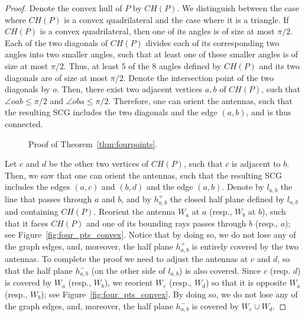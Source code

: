 \documentclass[11pt,letter]{article}
\newcommand{\old}[1]{{{}}}
\def\wedge#1{{W_{{#1}}}}
\begin{document}
\begin{proof}
Denote the convex hull of $P$ by $CH(P)$.
We distinguish between the case where $CH(P)$ is a convex quadrilateral and the case where it is a triangle.
If $CH(P)$ is a convex quadrilateral, then one of its angles is of size at most $\pi/2$.
Each of the two diagonals of $CH(P)$ divides each of its corresponding two angles into two smaller angles,
such that at least one of these smaller angles is of size at most $\pi/2$.
Thus, at least $5$ of the $8$ angles defined by $CH(P)$ and its two diagonals are of size at most $\pi/2$.
Denote the intersection point of the two diagonals by $o$. Then, there exist two adjacent vertices $a,b$ of $CH(P)$, such that
$\angle oab \leq \pi/2$ and $\angle oba \leq \pi/2$. Therefore, one can orient the antennas, such that
the resulting SCG includes the two diagonals and the edge $(a,b)$, and is thus connected.

\begin{figure}[htb]
 \centering
	\caption{Proof of Theorem~\ref{thm:fourpoints}.}
\end{figure}

\old{
\begin{figure}[htp]
   \centering
       \texttt{[image: fig/lemma1\_convex]}
       \texttt{[image: fig/lemma1\_concave2]}
   \caption{Proof of Theorem~\ref{thm:fourpoints}.}
   \label{fig:four_pts}
\end{figure}
}
Let $c$ and $d$ be the other two vertices of $CH(P)$, such that $c$ is adjacent to $b$.
Then, we saw that one can orient the antennas, such that the resulting SCG includes
the edges $(a,c)$ and $(b,d)$ and the edge $(a,b)$.
Denote by $l_{a,b}$ the line that passes through $a$ and $b$, and
by $h^+_{a,b}$ the closed half plane defined by $l_{a,b}$ and containing $CH(P)$.
Reorient the antenna $\wedge{a}$ at $a$ (resp., $\wedge{b}$ at $b$), such that it faces $CH(P)$ and one of its bounding rays
passes through $b$ (resp., $a$); see Figure~\ref{fig:four_pts_convex}.
Notice that by doing so, we do not lose any of the graph edges, and, moreover,
the half plane $h^+_{a,b}$ is entirely covered by the two antennas.
To complete the proof we need to adjust the antennas at $c$ and $d$, so that the half plane $h^-_{a,b}$
(on the other side of $l_{a,b}$) is also covered.
Since $c$ (resp. $d$) is covered by $\wedge{a}$ (resp., $\wedge{b}$), we reorient $\wedge{c}$ (resp., $\wedge{d}$) so that
it is opposite $\wedge{a}$ (resp., $\wedge{b}$); see Figure~\ref{fig:four_pts_convex}. By doing so,
we do not lose any of the graph edges, and, moreover, the half plane $h^-_{a,b}$ is covered by $\wedge{c} \cup \wedge{d}$.


\end{proof}
\end{document}
